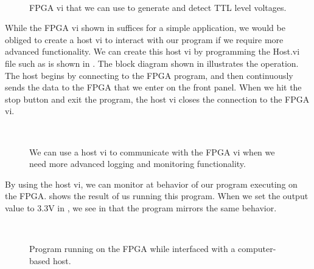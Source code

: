 \begin{figure}[!ht]
  \centering
   \\
  \caption[Example FPGA vi for digital input and output]{FPGA vi that we can use to generate and detect TTL level voltages. }
  \label{fig:fpga_vi}
\end{figure}

While the FPGA vi shown in  suffices for a simple application, we would be obliged to create a host vi to interact with our program if we require more advanced functionality.  We can create this host vi by programming the Host.vi file such as is shown in .  The block diagram shown in  illustrates the operation.  The host begins by connecting to the FPGA program, and then continuously sends the data to the FPGA that we enter on the front panel.  When we hit the stop button and exit the program, the host vi closes the connection to the FPGA vi.

\begin{figure}[!ht]
  \centering
   \\
  \caption[Example host vi]{We can use a host vi to communicate with the FPGA vi when we need more advanced logging and monitoring functionality.}
  \label{fig:host_vi}
\end{figure}


By using the host vi, we can monitor at behavior of our program executing on the FPGA.   shows the result of us running this program.  When we set the output value to 3.3V in , we see in  that the program mirrors the same behavior.


\begin{figure}[!ht]
  \centering
   \\
   \caption[Short Caption]{Program running on the FPGA while interfaced with a computer-based host.}
   \label{fig:fpga_run}
\end{figure}



